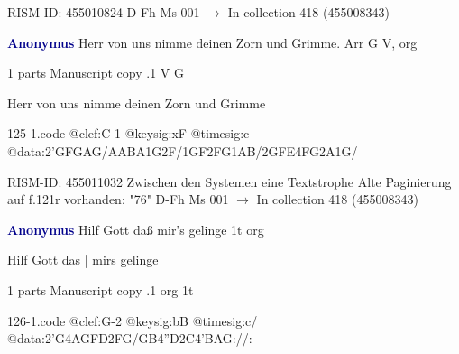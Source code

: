 \documentclass[twocolumn]{book}
\begin{document}
\newline RISM-ID: 455010824
\newline D-Fh  Ms 001
\newline $\rightarrow$ In collection 418 (455008343)

\newline \par \vspace{7pt} \textcolor{darkblue}{\textbf{Anonymus  }}
\newline Herr von uns nimme deinen Zorn und Grimme. Arr  G  
\newline V, org
\newline \begin{itshape}\end{itshape} 
\newline \textcolor{darkblue}{}  1 parts  
\newline Manuscript copy
.1  V  G
\newline \begin{footnotesize} Herr von uns nimme deinen Zorn und Grimme \end{footnotesize}  
\begin{filecontents*}{125-1.code}
@clef:C-1
@keysig:xF
@timesig:c
@data:2'GFGAG/AABA1G2F/1GF2FG1AB/2GFE4FG2A1G/
\end{filecontents*}
\newline
%

\newline RISM-ID: 455011032
\newline Zwischen den Systemen eine Textstrophe
\newline Alte Paginierung auf f.121r vorhanden: "76"
\newline D-Fh  Ms 001
\newline $\rightarrow$ In collection 418 (455008343)

\newline \par \vspace{7pt} \textcolor{darkblue}{\textbf{Anonymus  }}
\newline Hilf Gott daß mir's gelinge  1t  
\newline org
\newline \begin{itshape}[f.35v, at left:] Hilf Gott das | mirs gelinge\end{itshape} 
\newline \textcolor{darkblue}{}  1 parts  
\newline Manuscript copy
.1  org  1t  
\begin{filecontents*}{126-1.code}
@clef:G-2
@keysig:bB
@timesig:c/
@data:2'G4AGFD2FG/GB4''D2C4'BAG://:
\end{filecontents*}
\newline
%
\end{document}
